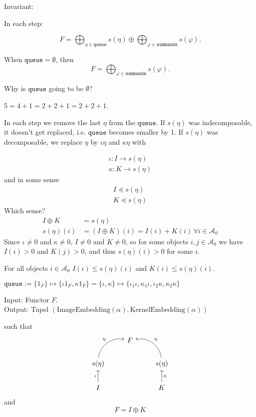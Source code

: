 Invariant:

In each step:

\[
F = \bigoplus_{\eta \in \mathtt{queue}} s(\eta) \oplus \bigoplus_{\varphi \in \mathtt{summands}} s(\varphi).
\]

When $\mathtt{queue} = \emptyset$, then
\[
F = \bigoplus_{\varphi \in \mathtt{summands}} s(\varphi).
\]

Why is $\mathtt{queue}$ going to be $\emptyset$?

$5 = 4+1 = 2+2+1 = 2+2+1$.

In each step we remove the last $\eta$ from the $\mathtt{queue}$. If $s(\eta)$ was indecomposable, it doesn't get replaced, i.e.
$\mathtt{queue}$ becomes smaller by 1. If $s(\eta)$ was decomposable, we replace $\eta$ by $\iota\eta$ and $\kappa\eta$ with

\begin{align}
\iota : I \rightarrow s(\eta) \\
\kappa : K \rightarrow s(\eta)
\end{align}
and in some sense
\begin{align}
I \preceq s(\eta) \\
K \preceq s(\eta)
\end{align}
Which sense?
\begin{align}
I \oplus K &= s(\eta) \\
s(\eta)(i) &= (I \oplus K)(i) = I(i) + K(i)\, \forall i \in \mathcal{A}_{0}
\end{align}
Since $\iota \neq 0$ and $\kappa \neq 0$, $I \neq 0$ and $K \neq 0$, so for some objects $i,j \in \mathcal{A}_{0}$ we have
$I(i) > 0$ and $K(j) > 0$, and thus $s(\eta)(i) > 0$ for some $i$.

For all objects $i\in \mathcal{A}_{0}$ $I(i) \leq s(\eta)(i)$ and $K(i) \leq s(\eta)(i)$.

$\mathtt{queue} := \{1_{F}\} \mapsto \{\iota 1_{F}, \kappa 1_{F}\} = \{\iota, \kappa \}
\mapsto \{ \iota_{1}\iota, \kappa_{1}\iota, \iota_{2}\kappa, \kappa_{2}\kappa \}$


Input: Functor $F$.\\
Output: Tupel $(\mathrm{ImageEmbedding}( \alpha ), \mathrm{KernelEmbedding}( \alpha ) )$

such that
\[
\begin{tikzcd}
                                       & F &                                         \\
s(\eta) \arrow[ru, "\eta", bend left=49]     &   & s(\eta) \arrow[lu, "\eta"', bend right=49]    \\
I \arrow[u, "\iota"] &   & K \arrow[u, "\kappa"']
\end{tikzcd}
\]
and
\[
F = I \oplus K
\]

